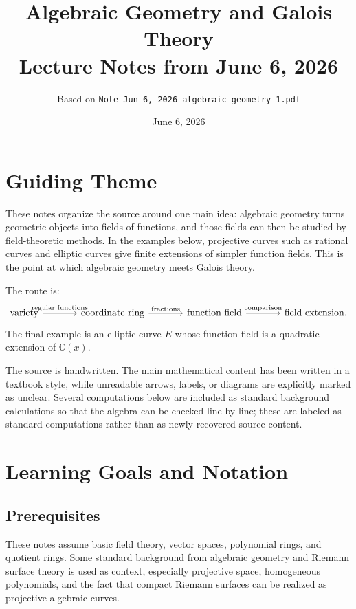 \documentclass[11pt]{article}
\title{Algebraic Geometry and Galois Theory\\
       \large Lecture Notes from June 6, 2026}
\author{Based on \texttt{Note Jun 6, 2026 algebraic geometry 1.pdf}}
\date{June 6, 2026}
\theoremstyle{definition}
\theoremstyle{remark}
\newcommand{\C}{\mathbb{C}}
\begin{document}
\maketitle
\tableofcontents

\section{Guiding Theme}

These notes organize the source around one main idea: algebraic geometry turns
geometric objects into fields of functions, and those fields can then be
studied by field-theoretic methods.  In the examples below, projective curves
such as rational curves and elliptic curves give finite extensions of simpler
function fields.  This is the point at which algebraic geometry meets Galois
theory.

The route is:
\[
\begin{tikzcd}[column sep=large]
  \text{variety}
    \arrow[r, "\text{regular functions}"]
  & \text{coordinate ring}
    \arrow[r, "\text{fractions}"]
  & \text{function field}
    \arrow[r, "\text{comparison}"]
  & \text{field extension}.
\end{tikzcd}
\]
The final example is an elliptic curve \(E\) whose function field is a
quadratic extension of \(\C(x)\).

The source is handwritten.  The main mathematical content has been written in
a textbook style, while unreadable arrows, labels, or diagrams are explicitly
marked as unclear.  Several computations below are included as standard
background calculations so that the algebra can be checked line by line; these
are labeled as standard computations rather than as newly recovered source
content.

\section{Learning Goals and Notation}

\subsection*{Prerequisites}

These notes assume basic field theory, vector spaces, polynomial rings, and
quotient rings.  Some standard background from algebraic geometry and Riemann
surface theory is used as context, especially projective space, homogeneous
polynomials, and the fact that compact Riemann surfaces can be realized as
projective algebraic curves.
\end{document}
